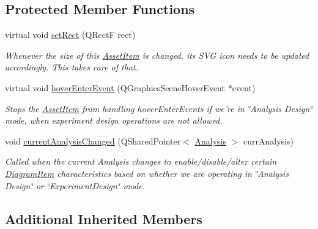 \subsection*{Protected Member Functions}
\begin{DoxyCompactItemize}
\item 
\hypertarget{class_experiment_item_a34547eb218632c45e929e6e35b44dd3a}{virtual void \hyperlink{class_experiment_item_a34547eb218632c45e929e6e35b44dd3a}{set\-Rect} (Q\-Rect\-F rect)}\label{class_experiment_item_a34547eb218632c45e929e6e35b44dd3a}

\begin{DoxyCompactList}\small\item\em Whenever the size of this \hyperlink{class_asset_item}{Asset\-Item} is changed, its S\-V\-G icon needs to be updated accordingly. This takes care of that. \end{DoxyCompactList}\item 
\hypertarget{class_experiment_item_acc9c0739670da642ed52042d55203f9e}{virtual void \hyperlink{class_experiment_item_acc9c0739670da642ed52042d55203f9e}{hover\-Enter\-Event} (Q\-Graphics\-Scene\-Hover\-Event $\ast$event)}\label{class_experiment_item_acc9c0739670da642ed52042d55203f9e}

\begin{DoxyCompactList}\small\item\em Stops the \hyperlink{class_asset_item}{Asset\-Item} from handling hover\-Enter\-Events if we're in \char`\"{}\-Analysis Design\char`\"{} mode, when experiment design operations are not allowed. \end{DoxyCompactList}\item 
void \hyperlink{class_experiment_item_ad059190b7458ecb348cf78652edea0c0}{current\-Analysis\-Changed} (Q\-Shared\-Pointer$<$ \hyperlink{class_picto_1_1_analysis}{Analysis} $>$ curr\-Analysis)
\begin{DoxyCompactList}\small\item\em Called when the current Analysis changes to enable/disable/alter certain \hyperlink{class_diagram_item}{Diagram\-Item} characteristics based on whether we are operating in \char`\"{}\-Analysis Design\char`\"{} or \char`\"{}\-Experiment\-Design\char`\"{} mode. \end{DoxyCompactList}\end{DoxyCompactItemize}
\subsection*{Additional Inherited Members}



